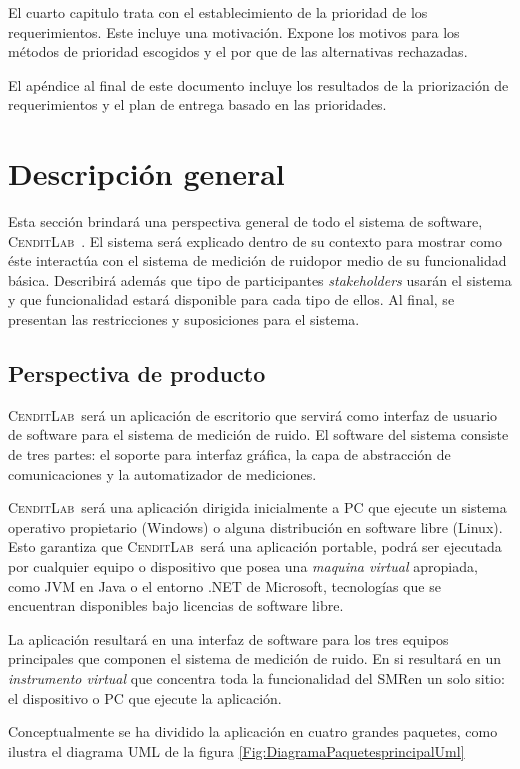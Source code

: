 \documentclass[paper=a4,oneside,fontsize=12pt]{scrartcl}
\newcommand{\AppName}{\textsc{CenditLab}\ }
\newcommand{\smr}{sistema de medición de ruido}
\newcommand{\SMR}{SMR}
\begin{document}
	El cuarto capitulo trata con el establecimiento de la prioridad de los requerimientos. Este incluye una motivación. Expone los motivos para los métodos de prioridad escogidos y el por que de las alternativas rechazadas.  
	
	El apéndice al final de este documento incluye los resultados de la priorización de requerimientos y el plan de entrega basado en las prioridades.
	
	\section{Descripción general}
	
	Esta sección brindará una perspectiva general de todo el sistema de software, \AppName. El sistema será explicado dentro de su contexto para mostrar como éste interactúa con el \smr por medio de su funcionalidad básica. Describirá además que tipo de participantes \textendash \emph{stakeholders} \textendash usarán el sistema y que funcionalidad estará disponible para cada tipo de ellos. Al final, se presentan las restricciones y suposiciones para el sistema.
	
	\subsection{Perspectiva de producto}
	
	\AppName será un aplicación de escritorio que servirá como interfaz de usuario de software para el \smr. El software del sistema consiste de tres partes: el soporte para interfaz gráfica, la capa de abstracción de comunicaciones y la automatizador de mediciones.
	
	\AppName será una aplicación dirigida inicialmente a PC que ejecute un sistema operativo propietario (Windows) o alguna distribución en software libre (Linux). Esto garantiza que \AppName será una aplicación portable, podrá ser ejecutada por cualquier equipo o dispositivo que posea una \emph{maquina virtual} apropiada, como JVM en Java o el entorno .NET de Microsoft, tecnologías que se encuentran disponibles bajo licencias de software libre.
	
	La aplicación resultará en una interfaz de software para los tres equipos principales que componen el \smr. En si resultará en un \emph{instrumento virtual} que concentra toda la funcionalidad del \SMR en un solo sitio: el dispositivo o PC que ejecute la aplicación.
	
	Conceptualmente se ha dividido la aplicación en cuatro grandes paquetes, como ilustra el diagrama UML de la figura \ref{Fig:DiagramaPaquetesprincipalUml}
	
\end{document}
